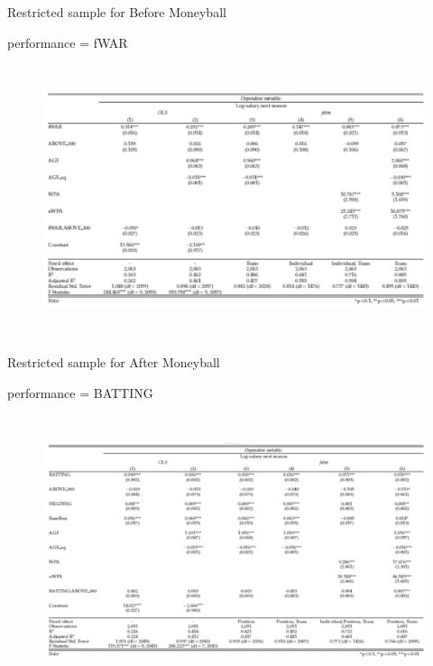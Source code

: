 \documentclass[dvipdfmx,12pt]{beamer}
\begin{document}
\begin{frame}
  \scriptsize
  Restricted sample for Before Moneyball

  performance = fWAR

  \begin{figure}
    \includegraphics[width = 12cm, height = 8cm]{fig_tab/mt_tab4_0.pdf}
\label{}
  \end{figure}
\end{frame}

\begin{frame}
  \scriptsize
  Restricted sample for After Moneyball

  performance = BATTING

  \begin{figure}
    \includegraphics[width = 12cm, height = 8cm]{fig_tab/mt_tab4.pdf}
\label{}
  \end{figure}
\end{frame}
\end{document}

